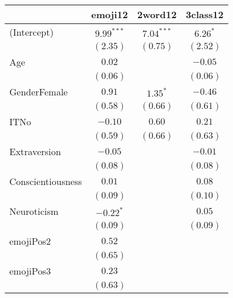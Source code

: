 \begin{table}
\begin{center}
\begin{tabular}{l c c c }
\hline
 & emoji12 & 2word12 & 3class12 \\
\hline
(Intercept)               & $9.99^{***}$ & $7.04^{***}$ & $6.26^{*}$ \\
                          & $(2.35)$     & $(0.75)$     & $(2.52)$   \\
Age                       & $0.02$       &              & $-0.05$    \\
                          & $(0.06)$     &              & $(0.06)$   \\
GenderFemale              & $0.91$       & $1.35^{*}$   & $-0.46$    \\
                          & $(0.58)$     & $(0.66)$     & $(0.61)$   \\
ITNo                      & $-0.10$      & $0.60$       & $0.21$     \\
                          & $(0.59)$     & $(0.66)$     & $(0.63)$   \\
Extraversion              & $-0.05$      &              & $-0.01$    \\
                          & $(0.08)$     &              & $(0.08)$   \\
Conscientiousness         & $0.01$       &              & $0.08$     \\
                          & $(0.09)$     &              & $(0.10)$   \\
Neuroticism               & $-0.22^{*}$  &              & $0.05$     \\
                          & $(0.09)$     &              & $(0.09)$   \\
emojiPos2                 & $0.52$       &              &            \\
                          & $(0.65)$     &              &            \\
emojiPos3                 & $0.23$       &              &            \\
                          & $(0.63)$     &              &            \\

\end{tabular}
\end{center}
\end{table}
